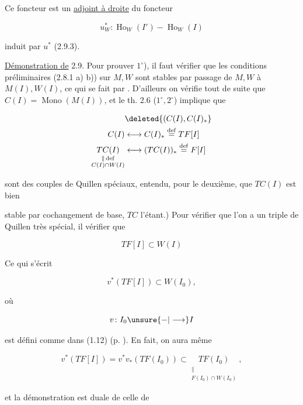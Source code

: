 Ce foncteur est un \uline{adjoint à droite} du
foncteur 

\[
 u^*_W\colon\operatorname{Ho}_W(I')\mathrel{-}\operatorname{Ho}_W(I)\tag*{(2.9.7.)}
\]

induit par $u^*$ (2.9.3).

\uline{Démonstration de} 2.9. Pour prouver $1^\circ$),
il faut vérifier  que les conditions préliminaires
(2.8.1 a) b)) sur $M,W$ sont stables
par passage de $M,W$ à $M(I),W(I)$, ce
qui se fait par . 
 D'ailleurs on vérifie tout de suite que
 $C(I)=\operatorname{Mono}(M(I))$,
et le th. 2.6 ($1^\circ,2^\circ$) implique  que

\[
\begin{aligned}
 &\deleted{(C(I),C(I)_*}\\
 C(I)&\longleftrightarrow C(I)_*\overset{\mathrm{def}}{=}TF[I]\\
 \underset{\substack{\|\,\mathrm{def}\\ C(I)\cap W(I)}}{TC(I)}
 &\longleftrightarrow(TC(I))_*\overset{\mathrm{def}}{=}F[I]
\end{aligned}
\]

sont des couples de Quillen spéciaux, 
entendu, pour le deuxième, que $TC(I)$ est bien

stable par cochangement de base, $TC$ l'étant.) Pour
vérifier que l'on a un triple de Quillen
très spécial, il  vérifier que

\[
 TF[I]\subset W(I)
\]

Ce qui  s'écrit

\[
 v^*(TF[I])\subset W(I_0),
\]

où

\[
 v\colon I_0\unsure{-|\longrightarrow}I
\]

est défini comme dans (1.12) (p. ). En fait,
on aura même

\[
 v^*(TF[I])=v^*v_*(TF(I_0))\subset
 \underset{\substack{\|\\ F(I_0)\cap W(I_0)}}{TF(I_0)},
\]

et la démonstration est duale de celle de

